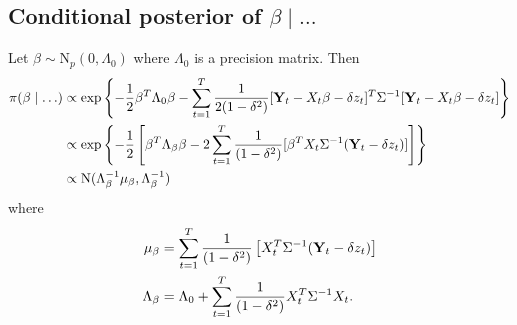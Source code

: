 \subsection*{Conditional posterior of $\beta \mid \ldots$}\label{s:betapost}
Let $\beta \sim \mbox{N}_{p}(0, \Lambda_0)$ where $\Lambda_0$ is a precision matrix. Then 
\begin{align*}
    \pi(\beta \mid \ldots) & \propto \exp \left\{ - \frac{ 1 }{ 2 } \beta^T \Lambda_0 \beta - \sum_{t = 1 }^T \frac{ 1 }{ 2 (1 - \delta^2) } [\mbox{\bf Y}_t - X_t \beta - \delta z_t]^T \Sigma^{-1} [\mbox{\bf Y}_t - X_t \beta - \delta z_t] \right\}\\
     & \propto \exp \left\{ -\frac{ 1 }{ 2 } \left[ \beta^T \Lambda_\beta \beta  - 2 \sum_{ t = 1 }^T \frac{ 1 }{ (1 - \delta^2) } [ \beta^T X_t \Sigma^{-1} (\mbox{\bf Y}_t - \delta z_t )] \right] \right\}\\
     & \propto \mbox{N} ( \Lambda_\beta^{-1} \mu_\beta , \Lambda_\beta^{-1})
\end{align*}
where
\begin{align*}
    \mu_\beta &= \sum_{t=1}^{T}\frac{ 1 }{ (1 - \delta^2) } \left[ X_t^T \Sigma^{-1} (\mbox{\bf Y}_t - \delta z_t) \right]\\
    \Lambda_\beta &= \Lambda_0 + \sum_{ t = 1 }^{ T} \frac{ 1 }{ (1 - \delta^2) } X_t^T \Sigma^{-1} X_t. 
\end{align*}
